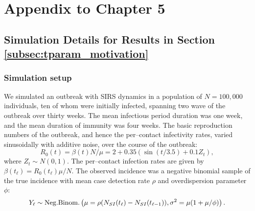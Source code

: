\chapter{Appendix to Chapter 5}
\label{chap:appendix_ch5}

\section{Simulation Details for Results in Section \ref{subsec:tparam_motivation}}
\label{sec:tparam_motiv_details}

\subsection{Simulation setup}
\label{subsec:tparam_motiv_setup}

We simulated an outbreak with SIRS dynamics in a population of $ N= 100,000$ individuals, ten of whom were initially infected, spanning two wave of the outbreak over thirty weeks. The mean infectious period duration was one week, and the mean duration of immunity was four weeks. The basic reproduction numbers of the outbreak, and hence the per--contact infectivity rates, varied sinusoidally with additive noise, over the course of the outbreak:
\begin{equation}
\label{eqn:sinfoi_true_R0t}
R_0(t) = \beta(t) N / \mu = 2 + 0.35(\sin(t / 3.5) + 0.1Z_t),
\end{equation} 
where $ Z_t \sim N(0,1)$.  The per--contact infection rates are given by $ \beta(t_\ell) = R_0(t_\ell) \mu / N $. The observed incidence was a negative binomial sample of the true incidence with mean case detection rate $ \rho $ and overdispersion parameter $ \phi $: 
\begin{equation}
Y_\ell \sim \mathrm{Neg.Binom.}\left (\mu  = \rho(N_{SI}(t_\ell) - N_{SI}(t_{\ell-1})), \sigma^2 = \mu(1 + \mu /\phi) \right ).
\end{equation}

